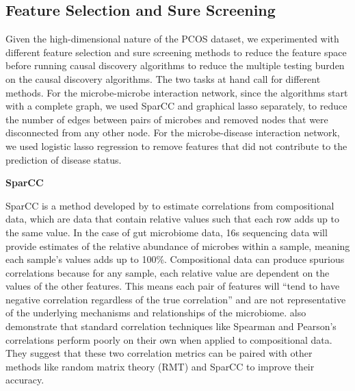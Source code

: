 \documentclass[12pt,letterpaper]{article}
\begin{document}
\subsection{Feature Selection and Sure Screening}

Given the high-dimensional nature of the PCOS dataset, we experimented with different feature selection and sure screening methods to reduce the feature space before running causal discovery algorithms to reduce the multiple testing burden on the causal discovery algorithms. The two tasks at hand call for different methods. For the microbe-microbe interaction network, since the algorithms start with a complete graph, we used SparCC and graphical lasso separately, to reduce the number of edges between pairs of microbes and removed nodes that were disconnected from any other node. For the microbe-disease interaction network, we used logistic lasso regression to remove features that did not contribute to the prediction of disease status. \newline

\textbf{SparCC}

SparCC is a method developed by \citep{friedman2012sparcc} to estimate correlations from compositional data, which are data that contain relative values such that each row adds up to the same value. In the case of gut microbiome data, 16s sequencing data will provide estimates of the relative abundance of microbes within a sample, meaning each sample’s values adds up to 100\%. Compositional data can produce spurious correlations because for any sample, each relative value are dependent on the values of the other features. This means each pair of features will “tend to have negative correlation regardless of the true correlation” and are not representative of the underlying mechanisms and relationships of the microbiome. \citep{weiss2016correlationbenchmark} also demonstrate that standard correlation techniques like Spearman and Pearson’s correlations perform poorly on their own when applied to compositional data. They suggest that these two correlation metrics can be paired with other methods like random matrix theory (RMT) and SparCC to improve their accuracy. 
\end{document}
